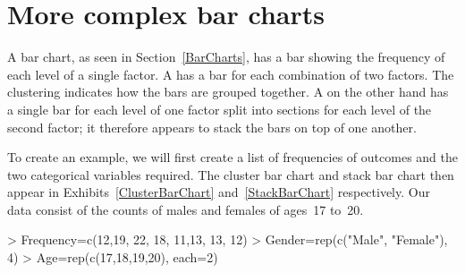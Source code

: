 \section{More complex bar charts} 
 
A bar chart, as seen in Section~\ref{BarCharts}, has a bar showing the frequency of each level of a single factor. A  has a bar for each combination of two factors. The clustering indicates how the bars are grouped together. A  on the other hand has a single bar for each level of one factor split into sections for each level of the second factor; it therefore appears to stack the bars on top of one another. 
 
To create an example, we will first create a list of frequencies of outcomes and the two categorical variables required. The cluster bar chart and stack bar chart then appear in Exhibits~\ref{ClusterBarChart} and~\ref{StackBarChart} respectively. Our data consist of the counts of males and females of ages~17 to~20. 

\begin{Schunk}
\begin{Sinput}
> Frequency=c(12,19, 22, 18, 11,13, 13, 12) 
> Gender=rep(c("Male", "Female"), 4) 
> Age=rep(c(17,18,19,20), each=2) 
\end{Sinput}
\end{Schunk}

